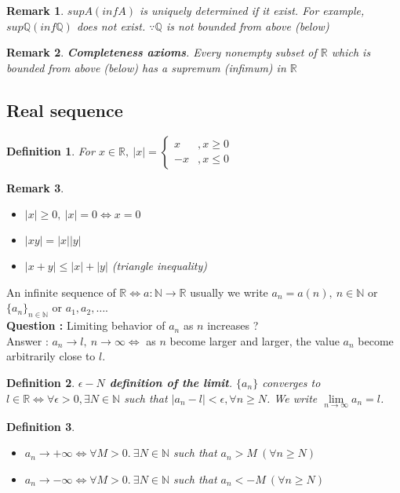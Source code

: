 \documentclass[a4paper,10pt]{article}
\newtheorem{remark}{Remark}
\newtheorem{defi}{Definition}
\newcommand{\R}{\mathbb{R}}
\newcommand{\N}{\mathbb{N}}
\newcommand{\Q}{\mathbb{Q}}
\begin{document}
\begin{remark}
	$ sup A (inf A) $ is uniquely determined if it exist. For example, $ sup \Q (inf \Q) $ does not exist. $ \because \Q $ is not bounded from above (below) 
\end{remark}

\begin{remark}
	\textbf{Completeness axioms}. Every nonempty subset of $ \R $ which is bounded from above (below) has a supremum (infimum) in $ \R $
\end{remark}

\subsection{Real sequence}
\begin{defi}
	For $ x\in \R, \ |x| = \begin{cases}
	x &, x \geq 0 \\ -x &, x \leq 0
	\end{cases} $
\end{defi}

\begin{remark}
	\begin{itemize}
		\item $ |x| \geq 0, \ |x|=0 \Leftrightarrow x=0 $
		\item $ |xy| = |x| |y| $
		\item $ |x+y| \leq |x| + |y| $ (triangle inequality)
	\end{itemize}
\end{remark}

An infinite sequence of $ \R \Leftrightarrow a: \N \rightarrow \R $ usually we write $ a_{n}=a(n) , \ n \in \N $ or $ \{ a_{n} \}_{n\in \N} $ or $ a_{1}, a_{2}, \dots $.\\
\textbf{Question :} Limiting behavior of $ a_{n} $ as $ n $ increases ?\\ 
Answer : $ a_{n} \rightarrow l, \ n \rightarrow \infty \Leftrightarrow $ as $ n $ become larger and larger, the value $ a_{n} $ become arbitrarily close to $ l $.

\begin{defi}
	\textbf{$ \epsilon-N $ definition of the limit}. $ \{ a_{n} \} $ converges to $ l \in \R \Leftrightarrow \forall \epsilon>0, \exists N \in \N $ such that $ |a_{n}-l| < \epsilon, \forall n \geq N $. We write $ \lim\limits_{n \rightarrow \infty} a_{n} = l $.
\end{defi}

\begin{defi}
	\begin{itemize}
		\item $ a_{n} \rightarrow +\infty \Leftrightarrow \forall M>0. \ \exists N \in \N $ such that $ a_{n}>M \ (\forall n\geq N)$
		\item $ a_{n} \rightarrow -\infty \Leftrightarrow \forall M>0. \ \exists N \in \N $ such that $ a_{n}<-M \ (\forall n\geq N)$
	\end{itemize}
\end{defi}
\end{document}
